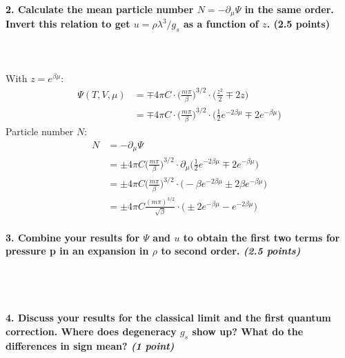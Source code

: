 \paragraph{2. Calculate the mean particle number 
    $N =-\partial_\mu\Psi$ in the same order. Invert this 
    relation to get $u=\rho\lambda^3/g_s$ as a function of $z$. 
    (2.5 points)
} \ \\
    \\
    With $z=e^{\beta\mu}$:
    \begin{align}
        \Psi(T,V,\mu)
        &=\mp 4\pi C\cdot\bigg(
            \frac{m\pi}{\beta}
            \bigg)^{3/2}\cdot\bigg(
            \frac{z^2}{2}\mp2z
        \bigg) \\
        &=\mp 4\pi C\cdot\bigg(
            \frac{m\pi}{\beta}
            \bigg)^{3/2}\cdot\bigg(
            \frac{1}{2}e^{-2\beta\mu}\mp2e^{-\beta\mu}
        \bigg)
    \end{align}
    Particle number $N$:
    \begin{align}
        N
        &=-\partial_\mu\Psi \\
        &=\pm 4\pi C\bigg(
            \frac{m\pi}{\beta}
        \bigg)^{3/2}\cdot\partial_\mu\bigg(
            \frac{1}{2}e^{-2\beta\mu}\mp2e^{-\beta\mu}
        \bigg) \\
        &=\pm 4\pi C\bigg(
            \frac{m\pi}{\beta}
        \bigg)^{3/2}\cdot\bigg(
            -\beta e^{-2\beta\mu}\pm2\beta e^{-\beta\mu}
        \bigg) \\
        &=\pm 4\pi C\frac{(m\pi)^{3/2}}{\sqrt{\beta}}
        \cdot\bigg(
            \pm2e^{-\beta\mu}-e^{-2\beta\mu}
        \bigg)
    \end{align}

\paragraph{3. Combine your results for $\Psi$ and $u$ to obtain 
    the first two terms for pressure p in an expansion in 
    $\rho$ to second order. \textit{(2.5 points)}
} \ \\
    \\

\paragraph{4. Discuss your results for the classical limit and 
    the first quantum correction. Where does degeneracy $g_s$
    show up? What do the differences in sign mean?
    \textit{(1 point)}
} \ \\
    \\
